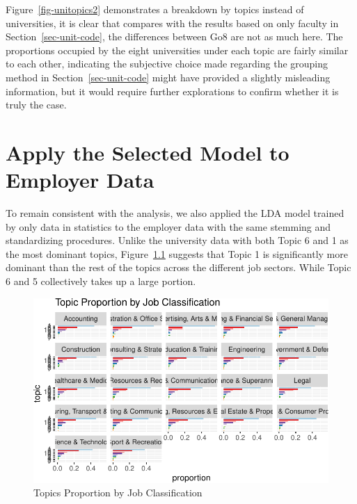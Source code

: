 \documentclass[
  letterpaper,
]{report}
\begin{document}
Figure~\ref{fig-unitopics2} demonstrates a breakdown by topics instead
of universities, it is clear that compares with the results based on
only faculty in Section~\ref{sec-unit-code}, the differences between Go8
are not as much here. The proportions occupied by the eight universities
under each topic are fairly similar to each other, indicating the
subjective choice made regarding the grouping method in
Section~\ref{sec-unit-code} might have provided a slightly misleading
information, but it would require further explorations to confirm
whether it is truly the case.

\hypertarget{sec-emptopic}{%
\chapter{Apply the Selected Model to Employer Data}\label{sec-emptopic}}

To remain consistent with the analysis, we also applied the LDA model
trained by only data in statistics to the employer data with the same
stemming and standardizing procedures. Unlike the university data with
both Topic 6 and 1 as the most dominant topics, Figure~\ref{fig-emp-lda}
suggests that Topic 1 is significantly more dominant than the rest of
the topics across the different job sectors. While Topic 6 and 5
collectively takes up a large portion.

\begin{figure}

{\centering \includegraphics{./04_2-joblda_files/figure-pdf/fig-emp-lda-1.pdf}

}

\caption{\label{fig-emp-lda}Topics Proportion by Job Classification}

\end{figure}
\end{document}
